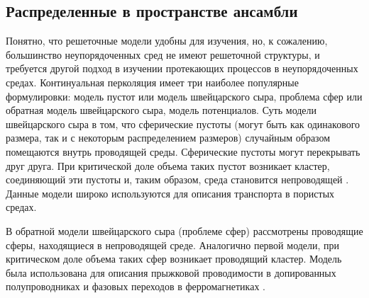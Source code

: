 \subsection{Распределенные в пространстве ансамбли}

Понятно, что решеточные модели удобны для изучения, но, к сожалению, большинство неупорядоченных сред не имеют решеточной структуры, и требуется другой подход в изучении протекающих процессов в неупорядоченных средах. Континуальная перколяция имеет три наиболее популярные формулировки: модель пустот или модель швейцарского сыра, проблема сфер или обратная модель швейцарского сыра, модель потенциалов. Суть модели швейцарского сыра в том, что сферические пустоты (могут быть как одинакового размера, так и с некоторым распределением размеров) случайным образом помещаются внутрь проводящей среды. Сферические пустоты могут перекрывать друг друга. При критической доле объема таких пустот возникает кластер, соединяющий эти пустоты и, таким образом, среда становится непроводящей \cite{tarasevich}. Данные модели широко используются для описания транспорта в пористых средах. 

В обратной модели швейцарского сыра (проблеме сфер) рассмотрены проводящие сферы, находящиеся в непроводящей среде. Аналогично первой модели, при критическом доле объема таких сфер возникает
проводящий кластер. Модель была использована для описания прыжковой проводимости в допированных полупроводниках \cite{schlovsky} и фазовых
переходов в ферромагнетиках \cite{abrikosov}. 



